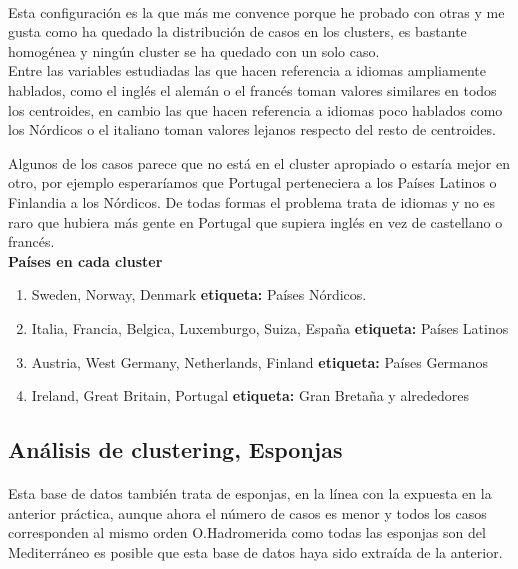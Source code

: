 \documentclass[es]{ifirak}
\begin{document}
\paragraph{}
Esta configuración es la que más me convence porque he probado con otras y me gusta como ha quedado la distribución de casos en los clusters, es bastante homogénea y ningún cluster se ha quedado con un solo caso.\\

Entre las variables estudiadas las que hacen referencia a idiomas ampliamente hablados, como el inglés el alemán o el francés toman valores similares en todos los centroides, en cambio las que hacen referencia a idiomas poco hablados como los Nórdicos o el italiano toman valores lejanos respecto del resto de centroides.\\
\pagebreak

Algunos de los casos parece que no está en el cluster apropiado o estaría mejor en otro, por ejemplo esperaríamos que Portugal perteneciera a los Países Latinos o Finlandia a los Nórdicos. De todas formas el problema trata de idiomas y no es raro que hubiera más gente en Portugal que supiera inglés en vez de castellano o francés.\\

\textbf{Países en cada cluster}
\begin{enumerate}
	\item Sweden, Norway, Denmark \textbf{etiqueta:} Países Nórdicos.
	\item Italia, Francia, Belgica, Luxemburgo, Suiza, España \textbf{etiqueta:} Países Latinos
	\item Austria, West Germany, Netherlands, Finland \textbf{etiqueta:} Países Germanos
	\item Ireland, Great Britain, Portugal \textbf{etiqueta:} Gran Bretaña y alrededores
	
\end{enumerate}

\pagebreak

\subsection{Análisis de clustering, Esponjas}
\paragraph{}
Esta base de datos también trata de esponjas, en la línea con la expuesta en la anterior práctica, aunque ahora el número de casos es menor y todos los casos corresponden al mismo orden O.Hadromerida como todas las esponjas son del Mediterráneo es posible que esta base de datos haya sido extraída de la anterior.\\
\end{document}
